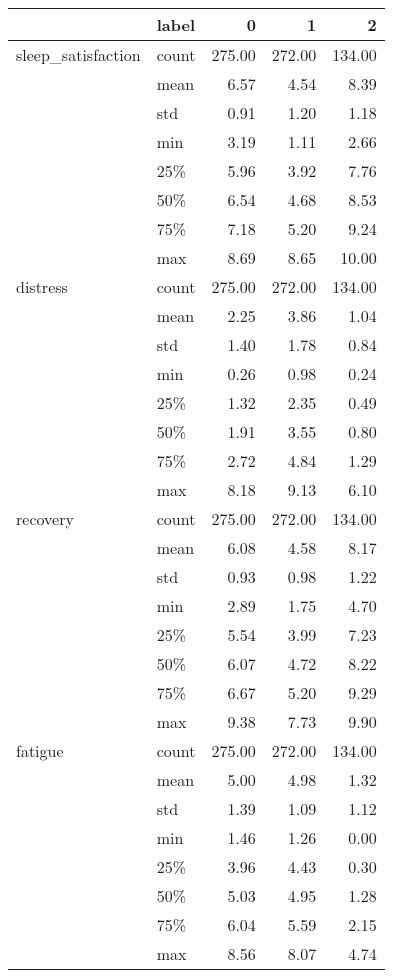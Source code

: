 \begin{tabular}{llrrr}
\toprule
        & label &       0 &       1 &       2 \\
\midrule
sleep\_satisfaction & count &  275.00 &  272.00 &  134.00 \\
        & mean &    6.57 &    4.54 &    8.39 \\
        & std &    0.91 &    1.20 &    1.18 \\
        & min &    3.19 &    1.11 &    2.66 \\
        & 25\% &    5.96 &    3.92 &    7.76 \\
        & 50\% &    6.54 &    4.68 &    8.53 \\
        & 75\% &    7.18 &    5.20 &    9.24 \\
        & max &    8.69 &    8.65 &   10.00 \\
distress & count &  275.00 &  272.00 &  134.00 \\
        & mean &    2.25 &    3.86 &    1.04 \\
        & std &    1.40 &    1.78 &    0.84 \\
        & min &    0.26 &    0.98 &    0.24 \\
        & 25\% &    1.32 &    2.35 &    0.49 \\
        & 50\% &    1.91 &    3.55 &    0.80 \\
        & 75\% &    2.72 &    4.84 &    1.29 \\
        & max &    8.18 &    9.13 &    6.10 \\
recovery & count &  275.00 &  272.00 &  134.00 \\
        & mean &    6.08 &    4.58 &    8.17 \\
        & std &    0.93 &    0.98 &    1.22 \\
        & min &    2.89 &    1.75 &    4.70 \\
        & 25\% &    5.54 &    3.99 &    7.23 \\
        & 50\% &    6.07 &    4.72 &    8.22 \\
        & 75\% &    6.67 &    5.20 &    9.29 \\
        & max &    9.38 &    7.73 &    9.90 \\
fatigue & count &  275.00 &  272.00 &  134.00 \\
        & mean &    5.00 &    4.98 &    1.32 \\
        & std &    1.39 &    1.09 &    1.12 \\
        & min &    1.46 &    1.26 &    0.00 \\
        & 25\% &    3.96 &    4.43 &    0.30 \\
        & 50\% &    5.03 &    4.95 &    1.28 \\
        & 75\% &    6.04 &    5.59 &    2.15 \\
        & max &    8.56 &    8.07 &    4.74 \\
\bottomrule
\end{tabular}

